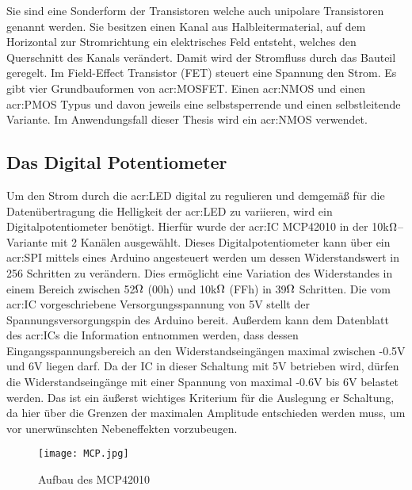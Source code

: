 Sie sind eine Sonderform der Transistoren welche auch unipolare Transistoren genannt werden. Sie besitzen einen Kanal aus Halbleitermaterial, auf dem Horizontal zur Stromrichtung ein elektrisches Feld entsteht, welches den Querschnitt des Kanals verändert. Damit wird der Stromfluss durch das Bauteil geregelt. Im Field-Effect Transistor (FET) steuert eine Spannung den Strom. Es gibt vier Grundbauformen von \gls{acr:MOSFET}. Einen \gls{acr:NMOS} und einen \gls{acr:PMOS} Typus und davon jeweils eine
selbstsperrende und einen selbstleitende Variante. Im Anwendungsfall dieser Thesis wird ein \gls{acr:NMOS} verwendet. \cite{heringElektrotechnikUndElektronik2018}






\newpage
\subsection{Das Digital Potentiometer}
\label{subsec:Unterabschnitt12}

Um den Strom durch die \gls{acr:LED} digital zu regulieren und demgemäß für die Datenübertragung die Helligkeit der \gls{acr:LED} zu variieren, wird ein Digitalpotentiometer benötigt. Hierfür wurde der \gls{acr:IC} MCP42010 in der 10k$\ohm$–Variante mit 2 Kanälen ausgewählt. Dieses Digitalpotentiometer kann über ein \gls{acr:SPI} mittels eines Arduino angesteuert werden um dessen Widerstandswert in 256 Schritten zu verändern. Dies ermöglicht eine Variation des Widerstandes in einem Bereich zwischen 52$\ohm$ (00h) und 10k$\ohm$ (FFh) in 39$\ohm$ Schritten. 
Die vom \gls{acr:IC} vorgeschriebene Versorgungsspannung von 5V stellt der Spannungsversorgungspin des Arduino bereit. Außerdem kann dem Datenblatt des \gls{acr:IC}s die Information entnommen werden, dass dessen Eingangsspannungsbereich an den Widerstandseingängen maximal zwischen -0.5V und 6V liegen darf. Da der IC in dieser Schaltung mit 5V betrieben wird, dürfen die Widerstandseingänge mit einer Spannung von maximal -0.6V bis 6V belastet werden. Das ist ein äußerst wichtiges Kriterium für die Auslegung er Schaltung, da hier über die Grenzen der maximalen Amplitude entschieden werden muss, um vor unerwünschten Nebeneffekten vorzubeugen.

\begin{figure}[H]
	\centering
	\texttt{[image: MCP.jpg]}
	\caption[Aufbau des MCP42010]{Aufbau des MCP42010} 
	\cite{MCP42}
	\label{fig:MCP}
\end{figure}

